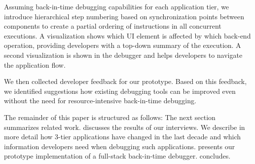 Assuming back-in-time debugging capabilities for each application tier, we introduce hierarchical step numbering based on synchronization points between components to create a partial ordering of instructions in all concurrent executions.
A visualization shows which UI element is affected by which back-end operation, providing developers with a top-down summary of the execution.
A second visualization is shown in the debugger and helps developers to navigate the application flow.

We then collected developer feedback for our prototype.
Based on this feedback, we identified suggestions how existing debugging tools can be improved even without the need for resource-intensive back-in-time debugging.

The remainder of this paper is structured as follows:
The next section summarizes related work.
 discusses the results of our interviews. 
We describe in more detail how 3-tier applications have changed in the last decade and which information developers need when debugging such applications.
 presents our prototype implementation of a full-stack back-in-time debugger.
 concludes.


